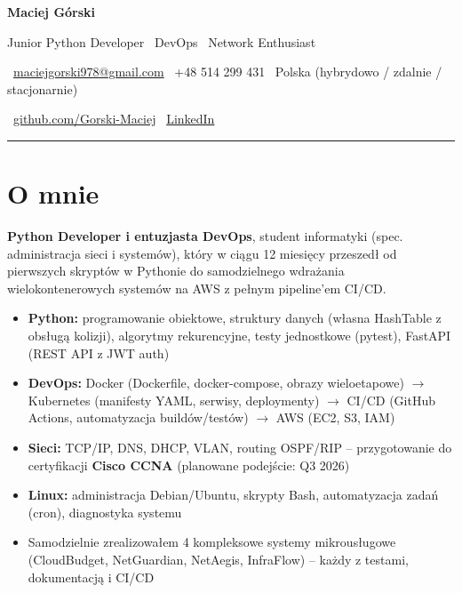 \documentclass[a4paper,10pt]{article}
\begin{document}
\begin{center}
  {\fontsize{26}{30}\selectfont\bfseries\color{navy} Maciej Górski\par}
  \vspace{0.15em}
  {\large\color{goldDark} Junior Python Developer \textbar\ DevOps \textbar\ Network Enthusiast\par}
  \vspace{0.4em}
  {\small\color{graytext}
  \faEnvelope\ \href{mailto:maciejgorski978@gmail.com}{maciejgorski978@gmail.com} \hspace{0.8em}
  \faPhone\ +48 514 299 431 \hspace{0.8em}
  \faMapMarker\ Polska (hybrydowo / zdalnie / stacjonarnie)
  }
  \par\vspace{0.15em}
  {\small\color{graytext}
  \faGithub\ \href{https://github.com/Gorski-Maciej}{github.com/Gorski-Maciej} \hspace{0.8em}
  \faLinkedin\ \href{https://linkedin.com/in/maciej-gorski-046176282}{LinkedIn}
  }
\end{center}
\vspace{0.2em}
{\color{gold!40!black}\rule{\textwidth}{0.3pt}}
\vspace{0.6em}

\section{O mnie}

\small
\textbf{Python Developer i entuzjasta DevOps}, student informatyki (spec. administracja sieci i systemów), który w ciągu 12 miesięcy przeszedł od pierwszych skryptów w Pythonie do samodzielnego wdrażania wielokontenerowych systemów na AWS z pełnym pipeline'em CI/CD.

\vspace{0.2em}
\begin{itemize}[leftmargin=*]
  \item \textbf{Python:} programowanie obiektowe, struktury danych (własna HashTable z obsługą kolizji), algorytmy rekurencyjne, testy jednostkowe (pytest), FastAPI (REST API z JWT auth)
  \item \textbf{DevOps:} Docker (Dockerfile, docker-compose, obrazy wieloetapowe) $\rightarrow$ Kubernetes (manifesty YAML, serwisy, deploymenty) $\rightarrow$ CI/CD (GitHub Actions, automatyzacja buildów/testów) $\rightarrow$ AWS (EC2, S3, IAM)
  \item \textbf{Sieci:} TCP/IP, DNS, DHCP, VLAN, routing OSPF/RIP -- przygotowanie do certyfikacji \textbf{Cisco CCNA} (planowane podejście: Q3 2026)
  \item \textbf{Linux:} administracja Debian/Ubuntu, skrypty Bash, automatyzacja zadań (cron), diagnostyka systemu
  \item Samodzielnie zrealizowałem 4 kompleksowe systemy mikrousługowe (CloudBudget, NetGuardian, NetAegis, InfraFlow) -- każdy z testami, dokumentacją i CI/CD
\end{itemize}
\end{document}

